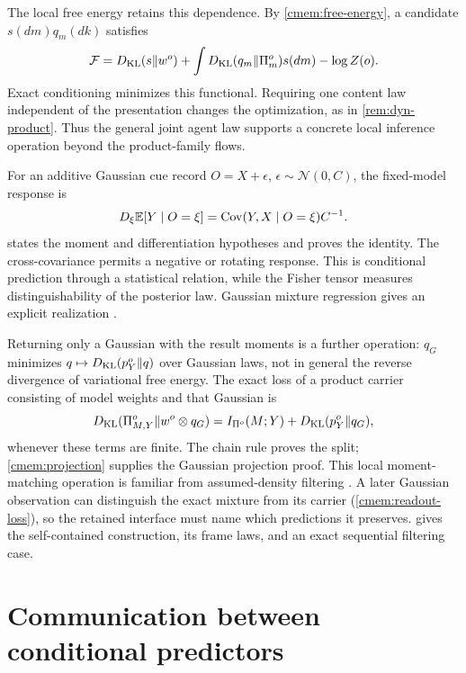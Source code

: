 The local free energy retains this dependence. By \cref{cmem:free-energy}, a candidate $s(dm)q_m(dk)$ satisfies
\begin{equation}
 \mathcal F=D_{\mathrm{KL}}(s\Vert w^o)+\int D_{\mathrm{KL}}(q_m\Vert\Pi_m^o)s(dm)-\log Z(o).
 \label{eq:conditional-prediction-energy}
\end{equation}
Exact conditioning minimizes this functional. Requiring one content law independent of the presentation changes the optimization, as in \cref{rem:dyn-product}. Thus the general joint agent law supports a concrete local inference operation beyond the product-family flows.

For an additive Gaussian cue record $O=X+\epsilon$, $\epsilon\sim\mathcal N(0,C)$, the fixed-model response is
\begin{equation}
 D_\xi\mathbb E[Y\mid O=\xi]=\operatorname{Cov}(Y,X\mid O=\xi)C^{-1}.
 \label{eq:conditional-prediction-response}
\end{equation}
 states the moment and differentiation hypotheses and proves the identity. The cross-covariance permits a negative or rotating response. This is conditional prediction through a statistical relation, while the Fisher tensor measures distinguishability of the posterior law. Gaussian mixture regression gives an explicit realization \citep{Calinon2016}.

Returning only a Gaussian with the result moments is a further operation: $q_G$ minimizes $q\mapsto D_{\mathrm{KL}}(p_Y^o\Vert q)$ over Gaussian laws, not in general the reverse divergence of variational free energy. The exact loss of a product carrier consisting of model weights and that Gaussian is
\begin{equation}
 D_{\mathrm{KL}}(\Pi_{M,Y}^o\Vert w^o\otimes q_G)
 =I_{\Pi^o}(M;Y)+D_{\mathrm{KL}}(p_Y^o\Vert q_G),
 \label{eq:conditional-prediction-loss}
\end{equation}
whenever these terms are finite. The chain rule proves the split; \cref{cmem:projection} supplies the Gaussian projection proof. This local moment-matching operation is familiar from assumed-density filtering \citep{Minka2001EP}. A later Gaussian observation can distinguish the exact mixture from its carrier (\cref{cmem:readout-loss}), so the retained interface must name which predictions it preserves.  gives the self-contained construction, its frame laws, and an exact sequential filtering case.

\section{Communication between conditional predictors}
\label{sec:interacting-prediction}

